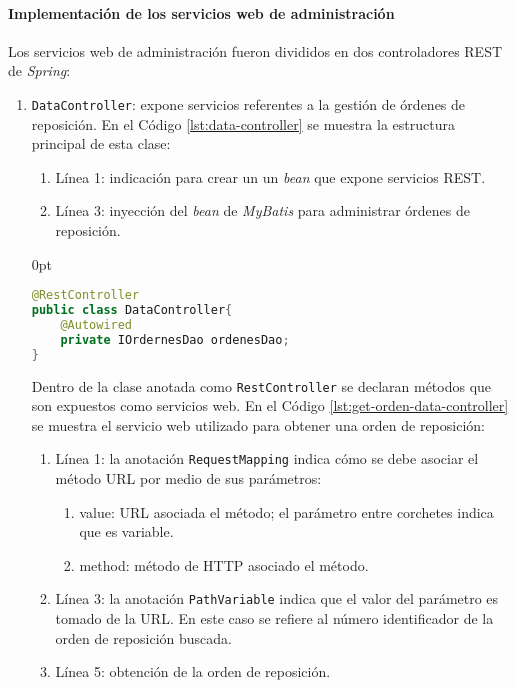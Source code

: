 \paragraph{\noindent Implementación de los servicios web de administración\\}
Los servicios web de administración fueron divididos en dos controladores REST de \textit{Spring}: 
\begin{enumerate}
	\item \texttt{DataController}: expone servicios referentes a la gestión de órdenes de reposición. En el Código \ref{lst:data-controller} se muestra la estructura principal de esta clase:
	\begin{enumerate}
		\item Línea 1: indicación para crear un un \textit{bean} que expone servicios REST.
		\item Línea 3: inyección del \textit{bean} de \textit{MyBatis} para administrar órdenes de reposición.
	\end{enumerate}
\begin{adjustwidth}{\listingfixwidth}{0pt}
\begin{lstlisting}[language=Java, caption={Controlador para exponer servicios web de órdenes de reposición.}, captionpos=b, label={lst:data-controller}]
@RestController
public class DataController{
	@Autowired
	private IOrdernesDao ordenesDao;
}
\end{lstlisting}
\end{adjustwidth}
	Dentro de la clase anotada como \texttt{RestController} se declaran métodos que son expuestos como servicios web. En el Código \ref{lst:get-orden-data-controller} se muestra el servicio web utilizado para obtener una orden de reposición:
	\begin{enumerate}
		\item Línea 1: la anotación \texttt{RequestMapping} indica cómo se debe asociar el método URL por medio de sus parámetros:
		\begin{enumerate}
			\item value: URL asociada el método; el parámetro entre corchetes indica que es variable.
			\item method: método de HTTP asociado el método.
		\end{enumerate}
		\item Línea 3: la anotación \texttt{PathVariable} indica que el valor del parámetro es tomado de la URL. En este caso se refiere al número identificador de la orden de reposición buscada.
		\item Línea 5: obtención de la orden de reposición.

\end{enumerate}
\end{enumerate}
